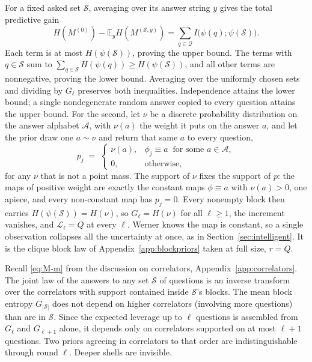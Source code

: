 \documentclass[11pt]{article}
\begin{document}
For a fixed asked set $\mathcal S$, averaging over its answer string
$y$ gives the total predictive gain
\[
  H(M^{(0)})-\mathbb E_y H(M^{(\mathcal S,y)})
  =\sum_{q\in\mathcal Q}I\big(\psi(q);\psi(\mathcal S)\big).
\]
Each term is at most $H(\psi(\mathcal S))$, proving the upper bound.
The terms with $q\in\mathcal S$ sum to
$\sum_{q\in\mathcal S}H(\psi(q))\geq H(\psi(\mathcal S))$,
and all other terms are nonnegative, proving the lower bound.
Averaging over the uniformly chosen sets and dividing by $G_\ell$
preserves both inequalities. Independence attains the lower bound;
a single nondegenerate random answer copied to every question attains
the upper bound. For the second, let $\nu$ be a discrete probability
distribution on the answer alphabet $\mathcal A$, with $\nu(a)$ the
weight it puts on the answer $a$, and let the prior draw one
$a \sim \nu$ and return that same $a$ to every question,
%
\begin{equation}
  p_j \;=\;
  \begin{cases}
    \nu(a), & \phi_j \equiv a \ \text{ for some } a \in \mathcal A,\\
    0, & \text{otherwise},
  \end{cases}
  \label{eq:cliqueQ}
\end{equation}
%
for any $\nu$ that is not a point mass. The support of $\nu$ fixes the
support of $p$: the maps of positive weight are exactly the constant
maps $\phi \equiv a$ with $\nu(a) > 0$, one apiece, and every
non-constant map has $p_j = 0$. Every nonempty block then carries
$H(\psi(\mathcal S)) = H(\nu)$, so $G_\ell = H(\nu)$ for all
$\ell \ge 1$, the increment vanishes, and $\mathcal L_\ell = Q$ at
every $\ell$. Werner knows the map is constant, so a single
observation collapses all the uncertainty at once, as in
Section~\ref{sec:intelligent}. It is the clique block law of
Appendix~\ref{app:blockpriors} taken at full size, $r = Q$.

Recall \eqref{eq:M-m} from the discussion on correlators,
Appendix~\ref{app:correlators}. The joint law of the answers to any set
$\mathcal S$ of questions is an inverse transform over the correlators
with support contained inside $\mathcal S$'s blocks. The mean block
entropy $G_{|\mathcal S|}$ does not depend on higher correlators
(involving more questions) than are in $\mathcal S$. Since the expected
leverage up to $\ell$ questions is assembled from $G_\ell$ and
$G_{\ell+1}$ alone, it depends only on correlators supported on at most
$\ell+1$ questions. Two priors agreeing in correlators to that order
are indistinguishable through round $\ell$. Deeper shells are
invisible.
\end{document}
